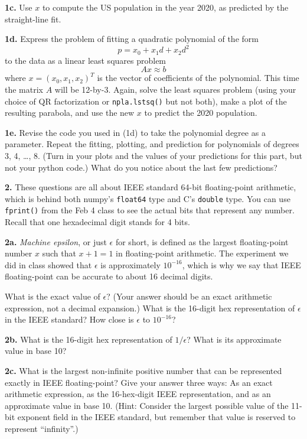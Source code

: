 \documentclass[11pt]{article}
\begin{document}
\par\medskip
{\bf 1c.}
Use $x$ to compute the US population in the year 2020, 
as predicted by the straight-line fit.

\par\medskip
{\bf 1d.}
Express the problem of fitting a quadratic polynomial of the form
$$ p = x_0 + x_1d + x_2d^2 $$
to the data as a linear least squares problem
$$A x \approx b$$
where $x = (x_0, x_1, x_2)^T$ is the vector of coefficients of the polynomial.
This time the matrix $A$ will be 12-by-3.
Again, solve the least squares problem 
(using your choice of QR factorization or {\tt npla.lstsq()} but not both),
make a plot of the resulting parabola, 
and use the new $x$ to predict the 2020 population.

\par\medskip
{\bf 1e.}
Revise the code you used in (1d) to take the polynomial degree as a parameter.
Repeat the fitting, plotting, and prediction 
for polynomials of degrees 3, 4, \ldots, 8.
(Turn in your plots and the values of your predictions for this part,
but not your python code.)
What do you notice about the last few predictions?

\par\bigskip
{\bf 2.}
These questions are all about IEEE standard 64-bit floating-point arithmetic,
which is behind both numpy's {\tt float64} type and C's {\tt double} type.
You can use {\tt fprint()} from the Feb 4 class to see
the actual bits that represent any number.
Recall that one hexadecimal digit stands for 4 bits.

\par\medskip
{\bf 2a.}
{\em Machine epsilon}, or just $\epsilon$ for short, is defined as the largest
floating-point number $x$ such that $x + 1 = 1$ in floating-point arithmetic.
The experiment we did in class showed that $\epsilon$ is approximately $10^{-16}$,
which is why we say that IEEE floating-point can be accurate to
about 16 decimal digits.

What is the exact value of $\epsilon$? (Your answer should be an exact arithmetic
expression, not a decimal expansion.) What is the 16-digit hex representation of
$\epsilon$ in the IEEE standard? How close is $\epsilon$ to $10^{-16}$?

\par\medskip
{\bf 2b.}
What is the 16-digit hex representation of $1/\epsilon$? What is its approximate
value in base 10?

\par\medskip
{\bf 2c.}
What is the largest non-infinite positive number that can be represented exactly
in IEEE floating-point? Give your answer three ways: As an exact arithmetic
expression, as the 16-hex-digit IEEE representation, and as an approximate
value in base 10. (Hint: Consider the largest possible value of the 11-bit
exponent field in the IEEE standard, but remember that value is reserved
to represent ``infinity''.)
\end{document}
